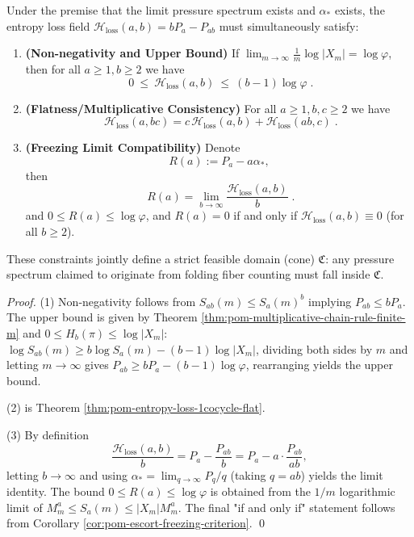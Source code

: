 \begin{theorem}\label{thm:pom-entropy-loss-feasibility-cone}
Under the premise that the limit pressure spectrum exists and \(\alpha_\ast\) exists, the entropy loss field \(\mathcal{H}_{\mathrm{loss}}(a,b)=bP_a-P_{ab}\) must simultaneously satisfy:
\begin{enumerate}
  \item \textbf{(Non-negativity and Upper Bound)} If \(\lim_{m\to\infty}\frac{1}{m}\log|X_m|=\log\varphi\), then for all \(a\ge 1,b\ge 2\) we have
  \[
  \boxed{\;
  0\ \le\ \mathcal{H}_{\mathrm{loss}}(a,b)\ \le\ (b-1)\log\varphi\; }.
  \]
  \item \textbf{(Flatness/Multiplicative Consistency)} For all \(a\ge 1,b,c\ge 2\) we have
  \[
  \boxed{\;
  \mathcal{H}_{\mathrm{loss}}(a,bc)=c\,\mathcal{H}_{\mathrm{loss}}(a,b)+\mathcal{H}_{\mathrm{loss}}(ab,c)\; }.
  \]
  \item \textbf{(Freezing Limit Compatibility)} Denote
  \[
  R(a):=P_a-a\alpha_\ast,
  \]
  then
  \[
  \boxed{\;
  R(a)=\lim_{b\to\infty}\frac{\mathcal{H}_{\mathrm{loss}}(a,b)}{b}\; }.
  \]
  and \(0\le R(a)\le \log\varphi\), and \(R(a)=0\) if and only if \(\mathcal{H}_{\mathrm{loss}}(a,b)\equiv 0\) (for all \(b\ge 2\)).
\end{enumerate}
These constraints jointly define a strict feasible domain (cone) \(\mathfrak{C}\): any pressure spectrum claimed to originate from folding fiber counting must fall inside \(\mathfrak{C}\).
\end{theorem}
\begin{proof}
(1) Non-negativity follows from \(S_{ab}(m)\le S_a(m)^b\) implying \(P_{ab}\le bP_a\).
The upper bound is given by Theorem \ref{thm:pom-multiplicative-chain-rule-finite-m} and \(0\le H_b(\pi)\le \log|X_m|\):
\(
\log S_{ab}(m)\ge b\log S_a(m)-(b-1)\log|X_m|
\),
dividing both sides by \(m\) and letting \(m\to\infty\) gives
\(
P_{ab}\ge bP_a-(b-1)\log\varphi
\), rearranging yields the upper bound.
\par
(2) is Theorem \ref{thm:pom-entropy-loss-1cocycle-flat}.
\par
(3) By definition
\[
\frac{\mathcal{H}_{\mathrm{loss}}(a,b)}{b}
=
P_a-\frac{P_{ab}}{b}
=P_a-a\cdot\frac{P_{ab}}{ab},
\]
letting \(b\to\infty\) and using \(\alpha_\ast=\lim_{q\to\infty}P_q/q\) (taking \(q=ab\)) yields the limit identity.
The bound \(0\le R(a)\le\log\varphi\) is obtained from the \(1/m\) logarithmic limit of \(M_m^a\le S_a(m)\le |X_m|M_m^a\).
The final "if and only if" statement follows from Corollary \ref{cor:pom-escort-freezing-criterion}. \qed
\end{proof}

\endinput
